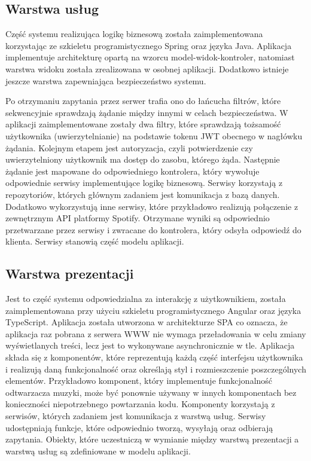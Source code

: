 \subsection{Warstwa usług}
Część systemu realizująca logikę biznesową została zaimplementowana korzystając ze szkieletu programistycznego Spring oraz języka Java. Aplikacja implementuje architekturę opartą na wzorcu model-widok-kontroler, natomiast warstwa widoku została zrealizowana w osobnej aplikacji. Dodatkowo istnieje jeszcze warstwa zapewniająca bezpieczeństwo systemu.

Po otrzymaniu zapytania przez serwer trafia ono do łańcucha filtrów, które sekwencyjnie sprawdzają żądanie między innymi w celach bezpieczeństwa. W aplikacji zaimplementowane zostały dwa filtry, które sprawdzają tożsamość użytkownika (uwierzytelnianie) na podstawie tokenu JWT obecnego w nagłówku żądania. Kolejnym etapem jest autoryzacja, czyli potwierdzenie czy uwierzytelniony użytkownik ma dostęp do zasobu, którego żąda. Następnie żądanie jest mapowane do odpowiedniego kontrolera, który wywołuje odpowiednie serwisy implementujące logikę biznesową. Serwisy korzystają z repozytoriów, których głównym zadaniem jest komunikacja z bazą danych. Dodatkowo wykorzystują inne serwisy, które przykładowo realizują połączenie z zewnętrznym API platformy Spotify. Otrzymane wyniki są odpowiednio przetwarzane przez serwisy i zwracane do kontrolera, który odsyła odpowiedź do klienta. Serwisy stanowią część modelu aplikacji.

\subsection{Warstwa prezentacji}
Jest to część systemu odpowiedzialna za interakcję z użytkownikiem, została zaimplementowana przy użyciu szkieletu programistycznego Angular oraz języka TypeScript. Aplikacja została utworzona w architekturze SPA co oznacza, że aplikacja raz pobrana z serwera WWW nie wymaga przeładowania w celu zmiany wyświetlanych treści, lecz jest to wykonywane asynchronicznie w tle. Aplikacja składa się z komponentów, które reprezentują każdą część interfejsu użytkownika i realizują daną funkcjonalność oraz określają styl i rozmieszczenie poszczególnych elementów. Przykładowo komponent, który implementuje funkcjonalność odtwarzacza muzyki, może być ponownie używany w innych komponentach bez konieczności niepotrzebnego powtarzania kodu. Komponenty korzystają z serwisów, których zadaniem jest komunikacja z warstwą usług. Serwisy udostępniają funkcje, które odpowiednio tworzą, wysyłają oraz odbierają zapytania. Obiekty, które uczestniczą w wymianie między warstwą prezentacji a warstwą usług są zdefiniowane w modelu aplikacji.


